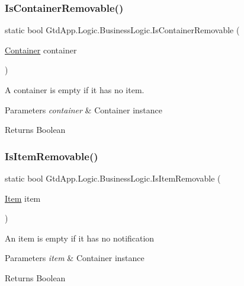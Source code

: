 \subsubsection{\texorpdfstring{Is\+Container\+Removable()}{IsContainerRemovable()}}
{\footnotesize\ttfamily static bool Gtd\+App.\+Logic.\+Business\+Logic.\+Is\+Container\+Removable (\begin{DoxyParamCaption}\item[{\mbox{\hyperlink{class_gtd_app_1_1_data_1_1_container}{Container}}}]{container }\end{DoxyParamCaption})\hspace{0.3cm}{\ttfamily [static]}}



A container is empty if it has no item. 


\begin{DoxyParams}{Parameters}
{\em container} & Container instance\\
\hline
\end{DoxyParams}
\begin{DoxyReturn}{Returns}
Boolean
\end{DoxyReturn}
\mbox{\label{class_gtd_app_1_1_logic_1_1_business_logic_a701d1378c420398991de26e17d60b810}} 
\subsubsection{\texorpdfstring{Is\+Item\+Removable()}{IsItemRemovable()}}
{\footnotesize\ttfamily static bool Gtd\+App.\+Logic.\+Business\+Logic.\+Is\+Item\+Removable (\begin{DoxyParamCaption}\item[{\mbox{\hyperlink{class_gtd_app_1_1_data_1_1_item}{Item}}}]{item }\end{DoxyParamCaption})\hspace{0.3cm}{\ttfamily [static]}}



An item is empty if it has no notification 


\begin{DoxyParams}{Parameters}
{\em item} & Container instance\\
\hline
\end{DoxyParams}
\begin{DoxyReturn}{Returns}
Boolean
\end{DoxyReturn}
\mbox{\label{class_gtd_app_1_1_logic_1_1_business_logic_a850d5c9c7bdc3377bc6333f5ea350560}} 

